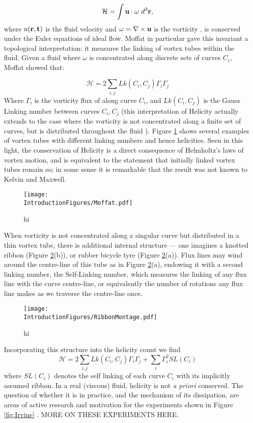 \begin{equation}
    \mathcal{H} = \int {\bf u} \cdot {\bf \omega} \ d^3 \bf r,
\end{equation}
where $u(\bf r,t)$ is the fluid velocity and $\omega = \nabla \times \bf u$ is the vorticity \cite{Saffman}, is conserved under the Euler equations of ideal flow. Moffat in particular gave this invariant a topological interpretation: it measures the linking of vortex tubes within the fluid. Given a fluid where $\omega$ is concentrated along discrete sets of curves $C_i$, Moffat showed that:

\begin{equation}
    \mathcal{H} = 2 \sum_{i,j} Lk(C_i,C_j) \Gamma_i \Gamma_j 
\end{equation}
Where $\Gamma_i$ is the vorticity flux of along curve $C_i$, and $Lk(C_i,C_j)$ is the Gauss Linking number between curves $C_i, C_j$ (this interpretation of Helicity actually extends to the case where the vorticity is not concentrated along a finite set of curves, but is distributed throughout the fluid \cite{Arnold,Berger,Berger}). Figure \ref{fig:Moffat} shows several examples of vortex tubes with different linking numbers and hence helicities. Seen in this light, the conservation of Helicity is a direct consequence of Helmholtz's laws of vortex motion, and is equivalent to the statement that initially linked vortex tubes remain so; in some sense it is remarkable that the result was not known to Kelvin and Maxwell.
\begin{figure}[htbp]
\centering
\texttt{[image: \\IntroductionFigures/Moffat.pdf]}
\caption{hi }
\label{fig:Moffat}
\end{figure}

When vorticity is not concentrated along a singular curve but distributed in a thin vortex tube, there is additional internal structure --- one imagines a knotted ribbon (Figure \ref{fig:RibbonMontage}(b)), or rubber bicycle tyre (Figure \ref{fig:RibbonMontage}(a)). Flux lines may wind around the centre-line of this tube as in Figure \ref{fig:RibbonMontage}(a), endowing it with a second linking number, the Self-Linking number, which measures the linking of any flux line with the curve centre-line, or equivalently the number of rotations any flux line makes as we traverse the centre-line once. 
\begin{figure}[htbp]
\centering
\texttt{[image: \\IntroductionFigures/RibbonMontage.pdf]}
\caption{hi }
\label{fig:RibbonMontage}
\end{figure}
Incorporating this structure into the helicity count we find \cite{MoffatRicca}
\begin{equation}
    \mathcal{H} = 2\sum_{i,j} Lk(C_i,C_j) \Gamma_i \Gamma_j + \sum_{i} \Gamma_i^2 SL(C_i) 
    \label{eq:HelicityCount}
\end{equation}
where $SL(C_i)$ denotes the self linking of each curve $C_i$ with its implicitly assumed ribbon. In a real (viscous) fluid, helicity is not \emph{a priori} conserved. The question of whether it is in practice, and the mechanism of its dissipation, are areas of active research and motivation for the experiments shown in Figure \ref{fig:Irvine} \cite{Klecker}. 
MORE ON THESE EXPERIMENTS HERE.

